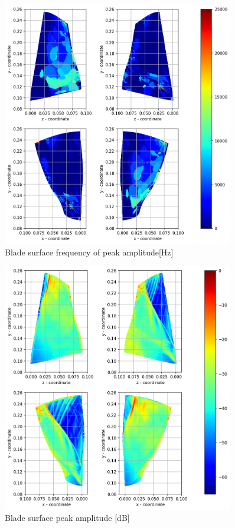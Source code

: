 \begin{figure}[ht]
	\centering
	\includegraphics[width=0.9\textwidth]{Figures/blade-peak-freq.png}
	\caption{Blade surface frequency of peak amplitude[Hz]} \label{blade-peak-freq}
\end{figure}

\begin{figure}[ht]
	\centering
	\includegraphics[width=0.9\textwidth]{Figures/blade-peak-mag.png}
	\caption{Blade surface peak amplitude [dB]} \label{blade-peak-mag}
\end{figure}

